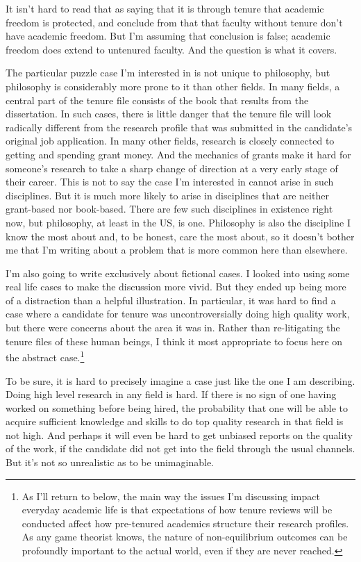 \documentclass[
  11pt,
  letterpaper,
  DIV=11,
  numbers=noendperiod,
  twoside]{scrartcl}
\begin{document}
It isn't hard to read that as saying that it is through tenure that
academic freedom is protected, and conclude from that that faculty
without tenure don't have academic freedom. But I'm assuming that
conclusion is false; academic freedom does extend to untenured faculty.
And the question is what it covers.

The particular puzzle case I'm interested in is not unique to
philosophy, but philosophy is considerably more prone to it than other
fields. In many fields, a central part of the tenure file consists of
the book that results from the dissertation. In such cases, there is
little danger that the tenure file will look radically different from
the research profile that was submitted in the candidate's original job
application. In many other fields, research is closely connected to
getting and spending grant money. And the mechanics of grants make it
hard for someone's research to take a sharp change of direction at a
very early stage of their career. This is not to say the case I'm
interested in cannot arise in such disciplines. But it is much more
likely to arise in disciplines that are neither grant-based nor
book-based. There are few such disciplines in existence right now, but
philosophy, at least in the US, is one. Philosophy is also the
discipline I know the most about and, to be honest, care the most about,
so it doesn't bother me that I'm writing about a problem that is more
common here than elsewhere.

I'm also going to write exclusively about fictional cases. I looked into
using some real life cases to make the discussion more vivid. But they
ended up being more of a distraction than a helpful illustration. In
particular, it was hard to find a case where a candidate for tenure was
uncontroversially doing high quality work, but there were concerns about
the area it was in. Rather than re-litigating the tenure files of these
human beings, I think it most appropriate to focus here on the abstract
case.\footnote{As I'll return to below, the main way the issues I'm
  discussing impact everyday academic life is that expectations of how
  tenure reviews will be conducted affect how pre-tenured academics
  structure their research profiles. As any game theorist knows, the
  nature of non-equilibrium outcomes can be profoundly important to the
  actual world, even if they are never reached.}

To be sure, it is hard to precisely imagine a case just like the one I
am describing. Doing high level research in any field is hard. If there
is no sign of one having worked on something before being hired, the
probability that one will be able to acquire sufficient knowledge and
skills to do top quality research in that field is not high. And perhaps
it will even be hard to get unbiased reports on the quality of the work,
if the candidate did not get into the field through the usual channels.
But it's not so unrealistic as to be unimaginable.
\end{document}
